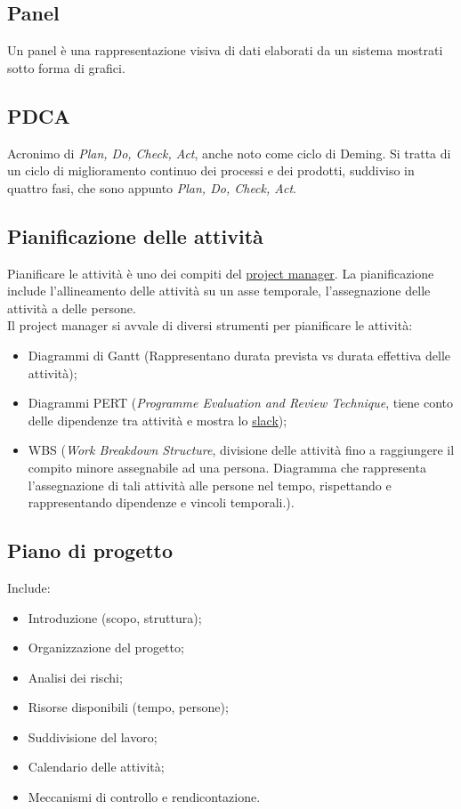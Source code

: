 	\subsection{Panel}
	\label{sec:panel}
	Un panel è una rappresentazione visiva di dati elaborati da un sistema mostrati sotto forma di grafici.


	\subsection{PDCA}
	\label{sec:pdca}
	Acronimo di \emph{Plan, Do, Check, Act}, anche noto come ciclo di Deming. Si tratta di un ciclo di miglioramento continuo dei processi e dei prodotti, suddiviso in quattro fasi, che sono appunto \emph{Plan, Do, Check, Act}.


	\subsection{Pianificazione delle attività}
	\label{sec:pianificazioneattivita}
	Pianificare le attività è uno dei compiti del \underline{\hyperref[sec:projectmanager]{project manager}}.
	La pianificazione include l'allineamento delle attività su un asse temporale, l'assegnazione delle attività a delle persone. \\Il project manager si avvale di diversi strumenti per pianificare le attività:
	\begin{itemize}
	\item Diagrammi di Gantt (Rappresentano durata prevista vs durata effettiva delle attività);
	\item Diagrammi PERT (\emph{Programme Evaluation and Review Technique}, tiene conto delle dipendenze tra attività e mostra lo \hyperref[sec:slack]{slack});
	\item WBS (\emph{Work Breakdown Structure}, divisione delle attività fino a raggiungere il compito minore assegnabile ad una persona. Diagramma che rappresenta l'assegnazione di tali attività alle persone nel tempo, rispettando e rappresentando dipendenze e vincoli temporali.).
	\end{itemize}


	\subsection{Piano di progetto}
	\label{sec:pianoprogetto}
	Include:
	\begin{itemize}
	\item Introduzione (scopo, struttura);
	\item Organizzazione del progetto;
	\item Analisi dei rischi;
	\item Risorse disponibili (tempo, persone);
	\item Suddivisione del lavoro;
	\item Calendario delle attività;
	\item Meccanismi di controllo e rendicontazione.
	\end{itemize}


